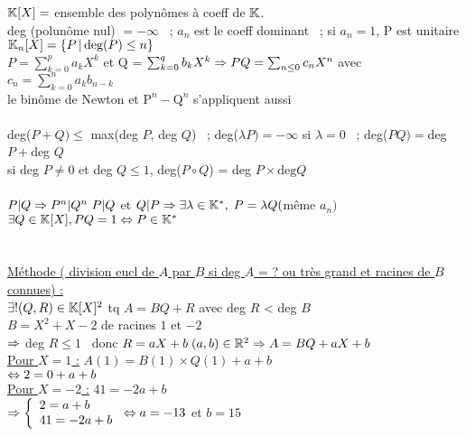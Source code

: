 \documentclass[12 pt]{exampleclass}
\begin{document}
\begin{flushleft}
\begin{doublespace}

	$\mathbb{K} [X] =$ ensemble des polynômes à coeff de $\mathbb{K}$.\\
	deg (polunôme nul) $= - \infty$ \ ; $a_n$ est le coeff dominant \ ; si $a_n = 1$, P est unitaire\\
	$\mathbb{K}_n[X] = \{P \, | \, \text{deg}(P)\leq n \}$\\
	$P = \sum_{k = 0}^p a_k X^k$ et Q = $\sum_{k=0}^q b_k X^k \Rightarrow PQ = \sum_{n \leq 0} c_n X^n$ avec $c_n = \sum_{k=0}^n a_k b_{n - k}$\\
	le binôme de Newton et $\text{P}^n - \text{Q}^n$ s'appliquent aussi\\
	
	\text{ }\\
	deg($P + Q) \leq$ max(deg $P$, deg $Q$) \ ; deg($\lambda P) = -\infty$ si $\lambda = 0$ \ ; deg($PQ) = $deg $P + $deg $Q$\\
	si deg $P \ne 0$ et deg $Q \leq 1$, deg($P\circ Q$) = deg $P \times\text{deg} Q$\\
	
	\text{ }\\
	$P|Q \Rightarrow P^n | Q^n \ P|Q$ et $Q|P \Rightarrow \exists \lambda \in \mathbb{K}^*,\; P = \lambda Q ($même $a_n)$\\
	$\exists Q\in \mathbb{K}[X], PQ = 1 \Leftrightarrow P\in \mathbb{K}^*$\\
	\text{}\\
	\text{ }\\
	\underline{Méthode ( division eucl de $A$ par $B$ si deg $A$ = ? ou très grand et racines de $B$ connues) :}\\
	$\exists! (Q,R)\in \mathbb{K}[X]^2$ tq $A = BQ + R$ avec deg $R$ < deg $B$\\
	$B = X^2 + X - 2$ de racines $1$ et $-2$\\
	$\Rightarrow$ deg $R \leq 1$ \, donc $R =aX + b \; (a,b)\in \mathbb{R}^2 \Rightarrow A = BQ + aX + b$\\
	\underline{Pour $X = 1$ :} $A(1) = B(1)\times Q(1) + a + b$\\
	\quad \quad \quad \quad \quad \quad$\Leftrightarrow 2 = 0 + a + b$\\
	\underline{Pour $X = - 2$ :} $41 = - 2a + b$\\
	  $\Rightarrow \left\{\begin{array}{ll} 2 = a + b \\  41 = -2a + b\end{array} \right. \Leftrightarrow a = -13$ et $b = 15$\\
	  

\end{doublespace}
\end{flushleft}
\end{document}
